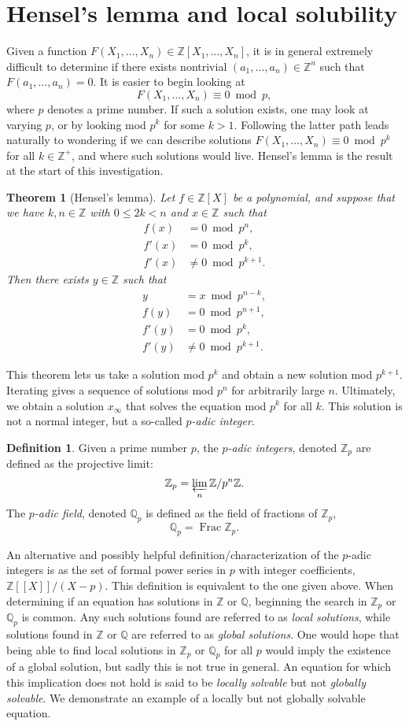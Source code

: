 \documentclass[12pt,twoside]{reedthesis}
\theoremstyle{plain}
\newtheorem{theorem}{Theorem}[chapter]
\theoremstyle{definition}
\newtheorem{definition}{Definition}[section]
\theoremstyle{remark}
\newcommand{\ZZ}{\mathbb{Z}}
\newcommand{\QQ}{\mathbb{Q}}
\newcommand{\Frac}{\operatorname{Frac}}
\begin{document}
\section{Hensel's lemma and local solubility}
Given a function $F(X_1,\ldots,X_n)\in\ZZ[X_1,\ldots,X_n]$, it is in general extremely difficult to determine if there exists nontrivial $(a_1,\ldots,a_n)\in\ZZ^n$ such that $F(a_1,\ldots,a_n)=0$. It is easier to begin looking at \[F(X_1,\ldots,X_n)\equiv0\bmod p,\] where $p$ denotes a prime number. If such a solution exists, one may look at varying $p$, or by looking mod $p^k$ for some $k>1$. Following the latter path leads naturally to wondering if we can describe solutions $F(X_1,\ldots,X_n)\equiv0\bmod p^k$ for all $k\in\ZZ^+$, and where such solutions would live. Hensel's lemma is the result at the start of this investigation.
\begin{theorem}[Hensel's lemma]
Let $f\in\ZZ[X]$ be a polynomial, and suppose that we have $k,n\in\ZZ$ with $0\leq2k<n$ and $x\in\ZZ$ such that
\begin{align*}
f(x)&=0\bmod p^n,\\
f'(x)&=0\bmod p^k,\\
f'(x)&\neq0\bmod p^{k+1}.
\end{align*}
Then there exists $y\in\ZZ$ such that 
\begin{align*}
y&=x\bmod p^{n-k},\\ f(y)&=0\bmod p^{n+1},\\ 
f'(y)&=0\bmod p^k,\\ f'(y)&\neq0\bmod p^{k+1}.
\end{align*}
\end{theorem}
\noindent This theorem lets us take a solution mod $p^k$ and obtain a new solution mod $p^{k+1}$. Iterating gives a sequence of solutions mod $p^n$ for arbitrarily large $n$. Ultimately, we obtain a solution $x_\infty$ that solves the equation mod $p^k$ for all $k$. This solution is not a normal integer, but a so-called \emph{$p$-adic integer}.
\begin{definition}
Given a prime number $p$, the \emph{$p$-adic integers}, denoted $\ZZ_p$ are defined as the projective limit:\[\ZZ_p=\varprojlim_n\ZZ/p^n\ZZ.\] The \emph{$p$-adic field}, denoted $\QQ_p$ is defined as the field of fractions of $\ZZ_p$, \[\QQ_p=\Frac\ZZ_p.\]
\end{definition} 
An alternative and possibly helpful definition/characterization of the $p$-adic integers is as the set of formal power series in $p$ with integer coefficients, $\ZZ[[X]]/(X-p)$. This definition is equivalent to the one given above. 
When determining if an equation has solutions in $\ZZ$ or $\QQ$, beginning the search in $\ZZ_p$ or $\QQ_p$ is common. Any such solutions found are referred to as \emph{local solutions}, while solutions found in $\ZZ$ or $\QQ$ are referred to as \emph{global solutions}. One would hope that being able to find local solutions in $\ZZ_p$ or $\QQ_p$ for all $p$ would imply the existence of a global solution, but sadly this is not true in general. An equation for which this implication does not hold is said to be \emph{locally solvable} but not \emph{globally solvable}. We demonstrate an example of a locally but not globally solvable equation.
\end{document}
